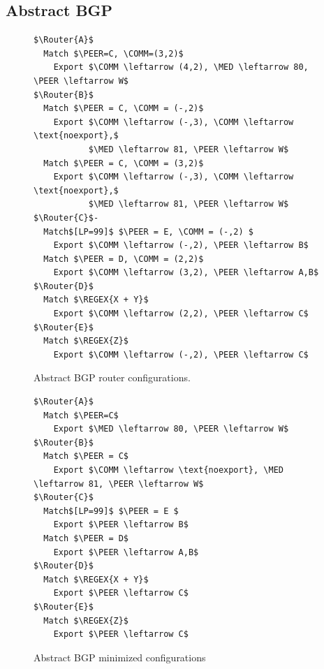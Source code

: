 \subsection{Abstract BGP}


\newcommand{\highlight}[1]{%
  \colorbox{red!50}{$\displaystyle#1$}}
\newcommand{\Router}[1]{ \textbf{Router #1:} }
\newcommand{\REGEX}[1]{ \text{regex}(#1) }
\newcommand{\PEER}{ \text{peer} }
\newcommand{\COMM} {\text{comm}}
\newcommand{\MED} {\text{MED}}


\begin{figure}[t!]
\begin{lstlisting}[frame=single, mathescape=true]
$\Router{A}$
  Match $\PEER=C, \COMM=(3,2)$
    Export $\COMM \leftarrow (4,2), \MED \leftarrow 80, \PEER \leftarrow W$
$\Router{B}$
  Match $\PEER = C, \COMM = (-,2)$
    Export $\COMM \leftarrow (-,3), \COMM \leftarrow \text{noexport},$
           $\MED \leftarrow 81, \PEER \leftarrow W$
  Match $\PEER = C, \COMM = (3,2)$
    Export $\COMM \leftarrow (-,3), \COMM \leftarrow \text{noexport},$
           $\MED \leftarrow 81, \PEER \leftarrow W$
$\Router{C}$-
  Match$[LP=99]$ $\PEER = E, \COMM = (-,2) $
    Export $\COMM \leftarrow (-,2), \PEER \leftarrow B$
  Match $\PEER = D, \COMM = (2,2)$
    Export $\COMM \leftarrow (3,2), \PEER \leftarrow A,B$
$\Router{D}$
  Match $\REGEX{X + Y}$
    Export $\COMM \leftarrow (2,2), \PEER \leftarrow C$
$\Router{E}$
  Match $\REGEX{Z}$
    Export $\COMM \leftarrow (-,2), \PEER \leftarrow C$
\end{lstlisting}
\label{fig:config}
\caption{Abstract BGP router configurations.}
\end{figure}


\begin{figure}[t!]
\begin{lstlisting}[frame=single, mathescape=true]
$\Router{A}$
  Match $\PEER=C$
    Export $\MED \leftarrow 80, \PEER \leftarrow W$
$\Router{B}$
  Match $\PEER = C$
    Export $\COMM \leftarrow \text{noexport}, \MED \leftarrow 81, \PEER \leftarrow W$
$\Router{C}$
  Match$[LP=99]$ $\PEER = E $
    Export $\PEER \leftarrow B$
  Match $\PEER = D$
    Export $\PEER \leftarrow A,B$
$\Router{D}$
  Match $\REGEX{X + Y}$
    Export $\PEER \leftarrow C$
$\Router{E}$
  Match $\REGEX{Z}$
    Export $\PEER \leftarrow C$
\end{lstlisting}
\label{fig:config-min}
\caption{Abstract BGP minimized configurations}
\end{figure}


